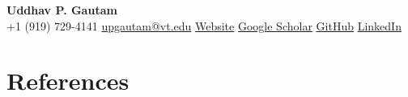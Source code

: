 \documentclass[10pt]{article}
\newcommand{\cvsection}[1]{\section*{#1}}
\begin{document}
\begin{center}
{\LARGE\bfseries Uddhav P. Gautam}\\[0.5em]
{\small
+1 (919) 729-4141 \;\textbullet\;
\href{mailto:upgautam@vt.edu}{upgautam@vt.edu}
\;\textbullet\;
\href{https://uddhavpgautam.github.io}{Website}
\;\textbullet\;
\href{https://scholar.google.com/citations?hl=en&user=Rbmabp4AAAAJ}{Google Scholar}
\;\textbullet\;
\href{https://github.com/uddhavpgautam}{GitHub}
\;\textbullet\;
\href{https://www.linkedin.com/in/uddhavpgautam/}{LinkedIn}
}
\end{center}

\vspace{10pt}

\cvsection{References}

\end{document}
